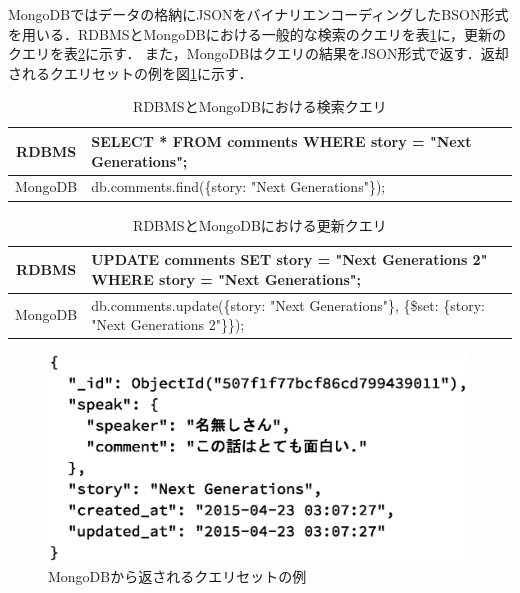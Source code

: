 \documentclass[a4paper,11pt]{ujreport}
\begin{document}
MongoDBではデータの格納にJSONをバイナリエンコーディングしたBSON形式を用いる\cite{Harrison201512}．RDBMSとMongoDBにおける一般的な検索のクエリを表\ref{table:RDB_Mongo_Find}に，更新のクエリを表\ref{table:RDB_Mongo_Update}に示す．
また，MongoDBはクエリの結果をJSON形式で返す．返却されるクエリセットの例を図\ref{MongoJson}に示す．
\begin{table}[htb]
  \begin{center}
    \caption{RDBMSとMongoDBにおける検索クエリ}
		\label{table:RDB_Mongo_Find}
    \begin{tabular}{|c|l|} \hline
			RDBMS & SELECT * FROM comments WHERE story = "Next Generations";\\ \hline
			MongoDB & db.comments.find(\{story: "Next Generations"\});\\ \hline
    \end{tabular}
  \end{center}
\end{table}
\begin{table}[htb]
  \begin{center}
    \caption{RDBMSとMongoDBにおける更新クエリ}
		\label{table:RDB_Mongo_Update}
    \begin{tabular}{|c|l|} \hline
			RDBMS & UPDATE comments SET story = "Next Generations 2" WHERE story = "Next Generations";\\ \hline
			MongoDB & db.comments.update(\{story: "Next Generations"\}, \{\$set: \{story: "Next Generations 2"\}\});\\ \hline
    \end{tabular}
  \end{center}
\end{table}

\begin{figure}[htbp]
	\begin{center}
		\includegraphics[width=30em, trim=10em 18em 10em 0em]{src/MongoJson.eps} %
	\end{center}
	\caption{MongoDBから返されるクエリセットの例}
	\label{MongoJson}
\end{figure}
\end{document}
